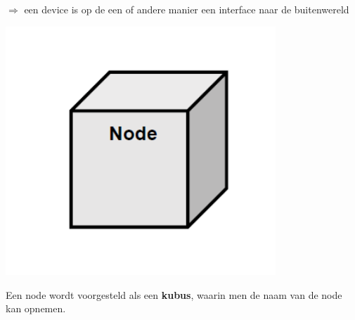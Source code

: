$\Rightarrow$ een device is op de een of andere manier een interface naar de buitenwereld


\begin{center}
\includegraphics[width=4in]{img/node}%
\label{labelname}%
\end{center}

Een node wordt voorgesteld als een \textbf{kubus}, waarin men de naam van de node kan opnemen.
